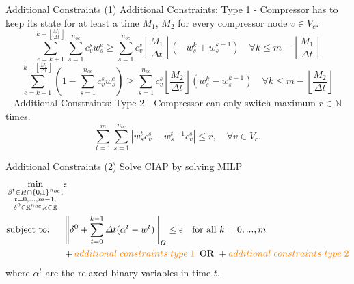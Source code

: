 \documentclass[8pt]{beamer}
\newcommand{\norm}[1]{\left\lVert#1\right\rVert} %
\begin{document}
\begin{frame}{Additional Constraints (1)}
\textcolor{bluepurp}{Additional Constraints: Type 1} - Compressor has to keep its state for at least a time $M_1$, $M_2$ for every compressor node $v \in V_c$.  
\begin{equation}
\sum_{e=k+1}^{k+\left\lfloor\frac{M_{1}}{\Delta t}\right\rfloor} \sum_{s=1}^{n_{oc}} c_{v}^{s} w_{s}^e\geq \sum_{s=1}^{n_{oc}} c_{v}^{s}\left\lfloor \frac{M_{1}}{\Delta t}\right\rfloor\left(-w_{s}^k+w_{s}^{k+1}\right) \quad \forall k \leq m - \left\lfloor\frac{M_{1}}{\Delta t}\right\rfloor
\label{EqAdd:6.10}
\end{equation}
\begin{equation}
\sum_{e=k+1}^{k+\left\lfloor\frac{M_{2}}{\Delta t}\right\rfloor}\left(1-\sum_{s=1}^{n_{oc}} c_{v}^{s} w_{s}^e\right) \geq \sum_{s=1}^{n_{oc}} c_{v}^{s}\left\lfloor\frac{M_{2}}{\Delta t}\right\rfloor\left(w_{s}^k-w_{s}^{k+1}\right) \quad \forall k \leq m - \left\lfloor\frac{M_{2}}{\Delta t}\right\rfloor
\label{Eq:6.11}
\end{equation}
\ \newline\newline
\textcolor{bluepurp}{Additional Constraints: Type 2} - Compressor can only switch maximum $r\in \mathbb{N}$ times.
\begin{equation}
\sum_{t=1}^m \sum_{s=1}^{n_{oc}} |w_{s}^t c_v^s - w_{s}^{t-1} c_v^s | \leq r, \quad \forall v \in V_c.
\label{Eq:6.11b}
\end{equation}
\end{frame}
\begin{frame}{Additional Constraints (2)}
\textcolor{bluepurp}{Solve CIAP by solving MILP}
\begin{alignat}{1}
\begin{split}
\min_{\substack{\beta^t \in H \cap \{0,1\}^{n_{oc}},  \\ t =0,...,m-1,  \\ \delta^0 \in \mathbb{R}^{n_{oc}}, \epsilon \in \mathbb{R}}}  &\epsilon      \\
\text{subject to: } \quad &\norm{\delta^0 + \sum_{t=0}^{k-1} \Delta t (\alpha^t-w^t)}_{\Omega} \leq \epsilon \quad  \text{for all } k=0,...,m \\
& + \textcolor{orange}{additional \; constraints \; type \; 1 \, }  \text{ OR } + \textcolor{orange}{additional \; constraints \; type \; 2}
\end{split}
\label{Eq:CIAP_MILP}
\end{alignat}
where $\alpha^t$ are the relaxed binary variables in time $t$.
\end{frame}
\end{document}
